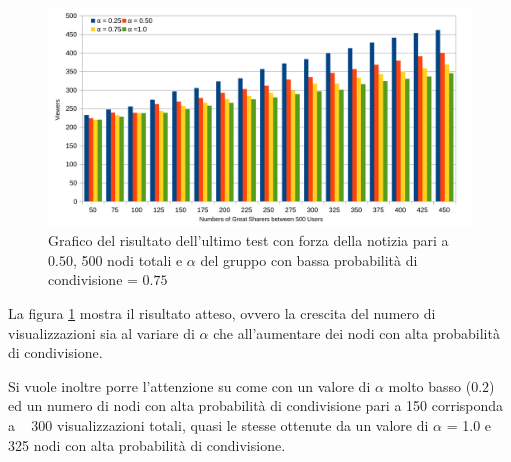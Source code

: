 \begin{figure}[!ht]
\vspace*{-20pt}
\centerline {
  \includegraphics[width=1\textwidth]{charts/last-test-str_0.5.pdf}
}
\caption{Grafico del risultato dell'ultimo test con forza della notizia pari a $0.50$, 
500 nodi totali e $\alpha$ del gruppo con bassa probabilità di condivisione = $0.75$}
\label{img:last_test_str_0_5}
\end{figure}

La figura \ref{img:last_test_str_0_5} mostra il risultato atteso, 
ovvero la crescita del numero di visualizzazioni sia al variare di $\alpha$ che all'aumentare 
dei nodi con alta probabilità di condivisione.

Si vuole inoltre porre l'attenzione su come con un valore di $\alpha$ 
molto basso ($0.2$) ed un numero di nodi con alta probabilità di condivisione pari a 150 corrisponda 
a ~ 300 visualizzazioni totali, quasi le stesse ottenute da un valore di $\alpha$ = 1.0 e 325 nodi con 
alta probabilità di condivisione.
















